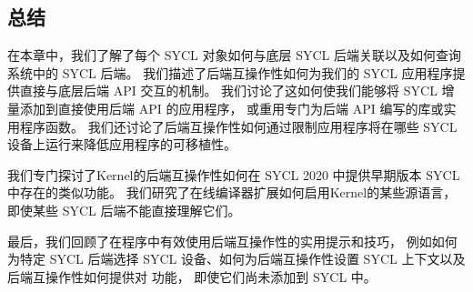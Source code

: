 \subsection{总结}
在本章中，我们了解了每个 SYCL 对象如何与底层 SYCL 后端关联以及如何查询系统中的 SYCL 后端。 
我们描述了后端互操作性如何为我们的 SYCL 应用程序提供直接与底层后端 API 交互的机制。 
我们讨论了这如何使我们能够将 SYCL 增量添加到直接使用后端 API 的应用程序，
或重用专门为后端 API 编写的库或实用程序函数。 
我们还讨论了后端互操作性如何通过限制应用程序将在哪些 SYCL 设备上运行来降低应用程序的可移植性。

我们专门探讨了Kernel的后端互操作性如何在 SYCL 2020 中提供早期版本 SYCL 中存在的类似功能。 
我们研究了在线编译器扩展如何启用Kernel的某些源语言，即使某些 SYCL 后端不能直接理解它们。

最后，我们回顾了在程序中有效使用后端互操作性的实用提示和技巧，
例如如何为特定 SYCL 后端选择 SYCL 设备、如何为后端互操作性设置 SYCL 上下文以及后端互操作性如何提供对 功能，
即使它们尚未添加到 SYCL 中。